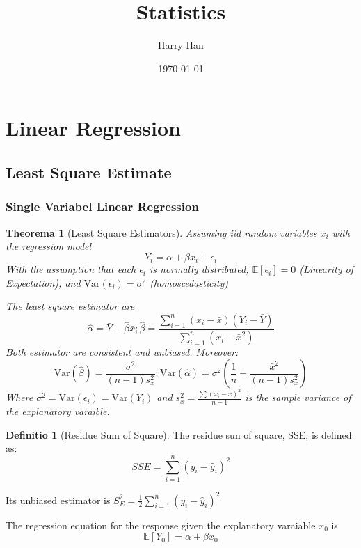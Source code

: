 \documentclass[12pt, a4paper]{article}
\title{Statistics}
\author{Harry Han}
\date{\today}
\newtheorem{theorem}{Theorema}[subsection]
\theoremstyle{definition}
\newtheorem{definition}{Definitio}[section]
\theoremstyle{remark}
\newcommand{\bb}[1]{\mathbb{#1}}
\newcommand{\var}[1]{\text{Var}(#1)}
\begin{document}
\maketitle

\section{Linear Regression}

\subsection{Least Square Estimate}

\subsubsection{Single Variabel Linear Regression}
\begin{theorem}[Least Square Estimators]
	Assuming iid random variables $x_i$ with the regression model
	\begin{equation}
		Y_i=\alpha + \beta	x_i + \epsilon_i
	\end{equation}
	With the assumption that each $\epsilon_i$ is normally distributed, $\bb{E}[\epsilon_i]=0$ (Linearity of Expectation), and $\var{ \epsilon_i }=\sigma^2$ (homoscedasticity) 

	The least square estimator are 
	\begin{equation}
		\hat{\alpha} = \bar{Y}-\hat{\beta}\bar{x}; \hat{\beta} = \frac{\sum^{n}_{i=1}(x_i-\bar{x})(Y_i-\bar{Y}) }{\sum^{n}_{i=1}(x_i-\bar{x}^2) }
	\end{equation}
	Both estimator are consistent and unbiased. Moreover:
	\begin{equation}
		\var{\hat{\beta}} = \frac{\sigma^2}{(n-1)s^2_x}; \var{\hat{ \alpha }}=\sigma^2\left(\frac{1}{n}+\frac{\bar{x}^2}{(n-1)s^2_x}\right)
	\end{equation}
	Where $\sigma^2=\var{\epsilon_i}=\var{Y_i}$ and $s_x^2= \frac{\sum (x_i-x)^2 }{n-1}$ is the sample variance of the explanatory varaible.
\end{theorem}


\begin{definition}[Residue Sum of Square]
	The residue sun of square, SSE, is defined as:
	\begin{equation}
		SSE=\sum^{n}_{i=1}(y_i-\hat{y}_i)^2
	\end{equation}


	Its unbiased estimator is $S^2_E = \frac{1}{2}\sum^{n}_{i=1}(y_i-\hat{y}_i)^2$
	
\end{definition}
The regression equation for the response given the explanatory varaiable $x_0$ is
\begin{equation}
	\bb{E}[Y_0]=\alpha + \beta x_0
\end{equation}
\end{document}
